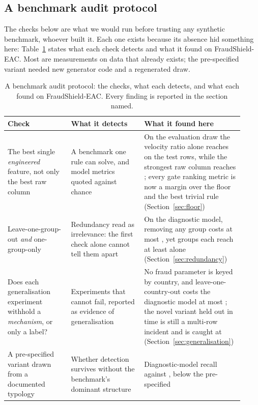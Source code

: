 \subsection{A benchmark audit protocol}

The checks below are what we would run before trusting any synthetic benchmark, whoever built it.
Each one exists because its absence hid something here: Table~\ref{tab:protocol} states what each
check detects and what it found on FraudShield-EAC. Most are measurements on data that already
exists; the pre-specified variant needed new generator code and a regenerated draw.

\begin{table}[htbp]
\centering
\small
\caption{A benchmark audit protocol: the checks, what each detects, and what each found on
FraudShield-EAC. Every finding is reported in the section named.}
\label{tab:protocol}
\begin{tabular}{p{0.26\linewidth}p{0.3\linewidth}p{0.36\linewidth}}
\toprule
Check & What it detects & What it found here \\
\midrule
The best single \emph{engineered} feature, not only the best raw column &
A benchmark one rule can solve, and model metrics quoted against chance &
On the evaluation draw the velocity ratio alone reaches \nGateFloor{} on the test rows, while the
strongest raw column reaches \nColumnMaxAUCB{}; every gate ranking metric is now a margin over the
floor and the best trivial rule (Section~\ref{sec:floor}) \\
\addlinespace
Leave-one-group-out \emph{and} one-group-only &
Redundancy read as irrelevance: the first check alone cannot tell them apart &
On the diagnostic model, removing any group costs at most \nGroupMaxDrop{}, yet \nGroupsAboveCeiling{} groups each reach at
least \nGroupGeographic{} alone (Section~\ref{sec:redundancy}) \\
\addlinespace
Does each generalisation experiment withhold a \emph{mechanism}, or only a label? &
Experiments that cannot fail, reported as evidence of generalisation &
No fraud parameter is keyed by country, and leave-one-country-out costs the diagnostic model at most \nLocoMaxLoss{};
the novel variant held out in time is still a multi-row incident and is caught at \nNovelRecall{}
(Section~\ref{sec:generalisation}) \\
\addlinespace
A pre-specified variant drawn from a documented typology &
Whether detection survives without the benchmark's dominant structure &
Diagnostic-model recall \nRevRecall{} \nRevCI{} against \nBaseVarRecall{} \nBaseVarCI{}, below the pre-specified

\end{tabular}
\end{table}
